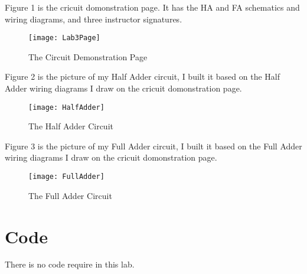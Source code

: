 \documentclass[11pt]{article}
\begin{document}
	Figure 1 is the cricuit domonstration page. It has the HA and FA schematics and wiring diagrams, and three instructor signatures.\\
	\begin{figure}[ht]\centering
		\texttt{[image: Lab3Page]}
		\caption{The Circuit Demonstration Page}
		\label{fig:Lab3Page}
	\end{figure}
	
	Figure 2 is the picture of my Half Adder circuit, I built it based on the Half Adder wiring diagrams I draw on the cricuit domonstration page.\\
	\begin{figure}[ht]\centering
		\texttt{[image: HalfAdder]}
		\caption{The Half Adder Circuit}
		\label{fig:HalfAdder}
	\end{figure}
	
	Figure 3 is the picture of my Full Adder circuit, I built it based on the Full Adder wiring diagrams I draw on the cricuit domonstration page.\\
	\begin{figure}[ht]\centering
		\texttt{[image: FullAdder]}
		\caption{The Full Adder Circuit}
		\label{fig:FullAdder}
	\end{figure}



\section*{Code}

	There is no code require in this lab.\\	
\end{document}

